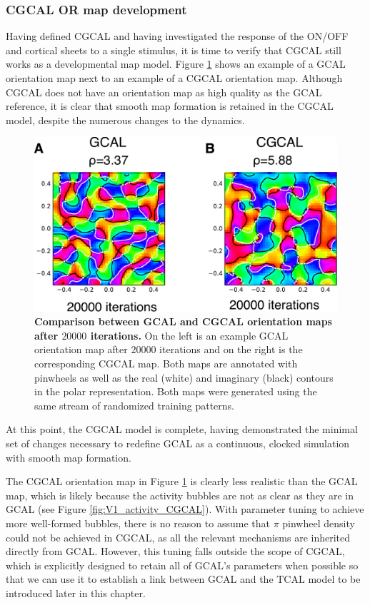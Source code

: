 \documentclass[phd,ianc,twoside]{infthesis}
\begin{document}
\subsubsection*{CGCAL OR map development}

Having defined CGCAL and having investigated the response of the ON/OFF
and cortical sheets to a single stimulus, it is time to verify that
CGCAL still works as a developmental map model. Figure
\ref{fig:CGCAL_OR_map} shows an example of a GCAL orientation map next
to an example of a CGCAL orientation map. Although CGCAL does not have
an orientation map as high quality as the GCAL reference, it is clear
that smooth map formation is retained in the CGCAL model, despite the
numerous changes to the dynamics.
\begin{figure}
\centerline{ \includegraphics[scale=0.5]{./figures/CGCAL_OR_map.pdf} }
\caption[]{{\bf Comparison between GCAL and CGCAL orientation maps after
    $20000$ iterations.} On the left is an example GCAL orientation map
  after $20000$ iterations and on the right is the corresponding CGCAL
  map. Both maps are annotated with pinwheels as well as the real
  (white) and imaginary (black) contours in the polar representation.
  Both maps were generated using the same stream of randomized training
  patterns.}
\label{fig:CGCAL_OR_map}
\end{figure}
At this point, the CGCAL model is complete, having demonstrated the
minimal set of changes necessary to redefine GCAL as a continuous,
clocked simulation with smooth map formation.

The CGCAL orientation map in Figure \ref{fig:CGCAL_OR_map} is clearly
less realistic than the GCAL map, which is likely because the activity
bubbles are not as clear as they are in GCAL (see Figure
\ref{fig:V1_activity_CGCAL}).  With parameter tuning to achieve more
well-formed bubbles, there is no reason to assume that $\pi$ pinwheel
density could not be achieved in CGCAL, as all the relevant mechanisms
are inherited directly from GCAL. However, this tuning falls outside
the scope of CGCAL, which is explicitly designed to retain all of
GCAL's parameters when possible so that we can use it to establish a
link between GCAL and the TCAL model to be introduced later in this
chapter.
\end{document}
